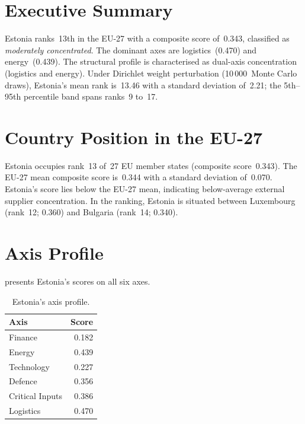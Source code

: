 \documentclass[12pt,a4paper]{article}
\begin{document}
\hypersetup{pageanchor=true}
\pagestyle{fancy}
\renewcommand{\headrulewidth}{0.4pt}


\section{Executive Summary}
\label{sec:summary}

Estonia ranks~13th in the EU-27 with a composite \ISI score of~0.343, classified as \emph{moderately concentrated}.  The dominant axes are logistics~(0.470) and energy~(0.439).  The structural profile is characterised as dual-axis concentration (logistics and energy).  Under Dirichlet weight perturbation (10\,000~Monte Carlo draws), Estonia's mean rank is~13.46 with a standard deviation of~2.21; the 5th--95th percentile band spans ranks~9 to~17.


\section{Country Position in the EU-27}
\label{sec:position}

Estonia occupies rank~13 of~27 EU member states (composite score~0.343).  The EU-27 mean composite score is~0.344 with a standard deviation of~0.070.  Estonia's score lies below the EU-27 mean, indicating below-average external supplier concentration.  In the ranking, Estonia is situated between Luxembourg (rank~12; 0.360) and Bulgaria (rank~14; 0.340).


\section{Axis Profile}
\label{sec:axis-profile}

 presents Estonia's scores on all six \ISI axes.

\begin{table}[htbp]
\centering\small
\caption{Estonia's \ISI axis profile.}
\label{tab:axis-profile}
\begin{tabular}{@{}lr@{}}
\toprule
\textbf{Axis} & \textbf{Score} \\
\midrule
    Finance           & 0.182 \\
    Energy            & 0.439 \\
    Technology        & 0.227 \\
    Defence           & 0.356 \\
    Critical Inputs   & 0.386 \\
    Logistics         & 0.470 \\
\bottomrule
\end{tabular}
\end{table}
\end{document}
